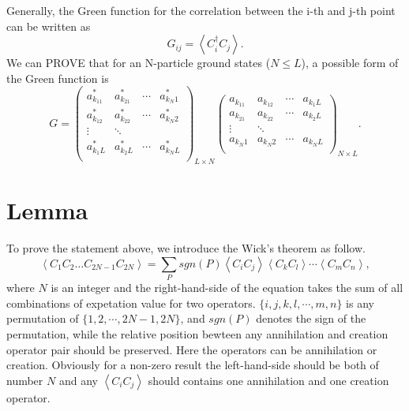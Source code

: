\documentclass[prb,superscriptaddress,letter,10pt,onecolumn]{revtex4}
\begin{document}
Generally, the Green function for the correlation between the i-th and j-th point can be written as
\begin{equation}
	G_{ij} = \left< C_i^\dagger C_j \right>.
\end{equation}
We can PROVE that for an N-particle ground states ($N\le L$), a possible form of the Green function is
\begin{equation}
	G = 
	\left(                 	
	\begin{array}{cccc}   		
		a_{k_11}^* & a_{k_21}^* & \cdots & a_{k_N1}^*\\  		
		a_{k_12}^* & a_{k_22}^* & \cdots & a_{k_N2}^*\\
		\vdots & \ddots &  & \\
		a_{k_1L}^* & a_{k_2L}^* & \cdots & a_{k_NL}^*\\  		
	\end{array}	
	\right)_{L\times N}
	\left( 
	\begin{array}{cccc}   		
		a_{k_11} & a_{k_12} & \cdots & a_{k_1L}\\  		
		a_{k_21} & a_{k_22} & \cdots & a_{k_2L}\\
		\vdots & \ddots &  & \\
		a_{k_N1} & a_{k_N2} & \cdots & a_{k_NL}\\  		
	\end{array}	
	\right)_{N\times L}.
\end{equation}

\section{Lemma}

To prove the statement above, we introduce the Wick's theorem as follow.
\begin{equation}
	\left< C_1C_2\dots C_{2N-1}C_{2N} \right> = \sum_{P} sgn(P)\left< C_iC_j\right>\left< C_kC_l\right>\cdots\left< C_mC_n\right>,
\end{equation}
where $N$ is an integer and the right-hand-side of the equation takes the sum of all combinations of expetation value for two operators. $\{i,j,k,l,\cdots,m,n\}$ is any permutation of $\{1,2,\cdots,2N-1,2N\}$, and $sgn(P)$ denotes the sign of the permutation, while the relative position bewteen any annihilation and creation operator pair should be preserved.
Here the operators can be annihilation or creation.
Obviously for a non-zero result the left-hand-side should be both of number $N$ and any $\left< C_iC_j\right>$ should contains one annihilation and one creation operator.
\end{document}
